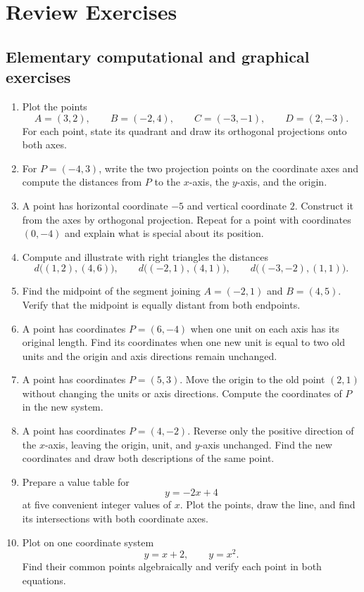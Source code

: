 \section{Review Exercises}

\subsection{Elementary computational and graphical exercises}

\begin{enumerate}

\item Plot the points
\[
A=(3,2),\qquad B=(-2,4),\qquad C=(-3,-1),\qquad D=(2,-3).
\]
For each point, state its quadrant and draw its orthogonal projections onto both
axes.

\item For $P=(-4,3)$, write the two projection points on the coordinate axes and
compute the distances from $P$ to the $x$-axis, the $y$-axis, and the origin.

\item A point has horizontal coordinate $-5$ and vertical coordinate $2$. Construct
it from the axes by orthogonal projection. Repeat for a point with coordinates
$(0,-4)$ and explain what is special about its position.

\item Compute and illustrate with right triangles the distances
\[
d\bigl((1,2),(4,6)\bigr),
\qquad
d\bigl((-2,1),(4,1)\bigr),
\qquad
d\bigl((-3,-2),(1,1)\bigr).
\]

\item Find the midpoint of the segment joining $A=(-2,1)$ and $B=(4,5)$. Verify
that the midpoint is equally distant from both endpoints.

\item A point has coordinates $P=(6,-4)$ when one unit on each axis has its
original length. Find its coordinates when one new unit is equal to two old
units and the origin and axis directions remain unchanged.

\item A point has coordinates $P=(5,3)$. Move the origin to the old point $(2,1)$
without changing the units or axis directions. Compute the coordinates of $P$ in
the new system.

\item A point has coordinates $P=(4,-2)$. Reverse only the positive direction of
the $x$-axis, leaving the origin, unit, and $y$-axis unchanged. Find the new
coordinates and draw both descriptions of the same point.

\item Prepare a value table for
\[
y=-2x+4
\]
at five convenient integer values of $x$. Plot the points, draw the line, and
find its intersections with both coordinate axes.

\item Plot on one coordinate system
\[
y=x+2,
\qquad
y=x^2.
\]
Find their common points algebraically and verify each point in both equations.

\end{enumerate}

